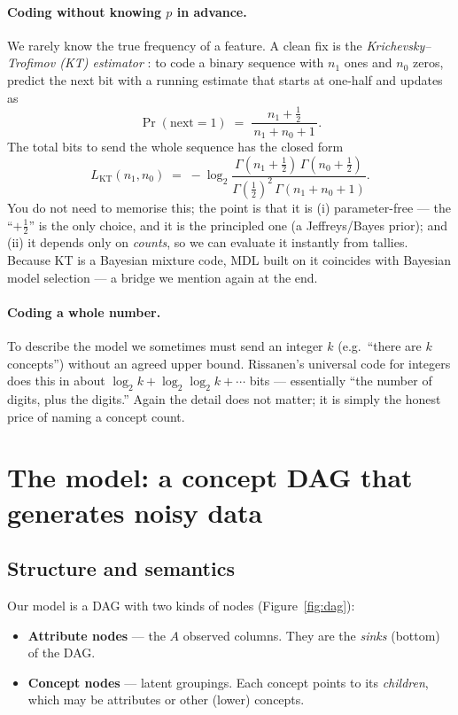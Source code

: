 \documentclass[11pt]{article}
\newcommand{\CL}{L}                       %
\begin{document}
\paragraph{Coding without knowing $p$ in advance.} We rarely know the true
frequency of a feature. A clean fix is the \emph{Krichevsky--Trofimov (KT)
estimator} \cite{krichevsky1981}: to code a binary sequence with $n_1$ ones and
$n_0$ zeros, predict the next bit with a running estimate that starts at
one-half and updates as
\[
  \Pr(\text{next}=1) \;=\; \frac{n_1 + \tfrac12}{\,n_1 + n_0 + 1\,}.
\]
The total bits to send the whole sequence has the closed form
\[
  \CL_{\mathrm{KT}}(n_1,n_0)
  \;=\; -\log_2 \frac{\Gamma(n_1+\tfrac12)\,\Gamma(n_0+\tfrac12)}
                     {\Gamma(\tfrac12)^2\,\Gamma(n_1+n_0+1)} .
\]
You do not need to memorise this; the point is that it is (i) parameter-free ---
the ``$+\tfrac12$'' is the only choice, and it is the principled one (a
Jeffreys/Bayes prior); and (ii) it depends only on \emph{counts}, so we can
evaluate it instantly from tallies. Because KT is a Bayesian mixture code, MDL
built on it coincides with Bayesian model selection --- a bridge we mention again
at the end.

\paragraph{Coding a whole number.} To describe the model we sometimes must send
an integer $k$ (e.g.\ ``there are $k$ concepts'') without an agreed upper bound.
Rissanen's universal code for integers \cite{rissanen1983} does this in about
$\log_2 k + \log_2\log_2 k + \cdots$ bits --- essentially ``the number of digits,
plus the digits.'' Again the detail does not matter; it is simply the honest
price of naming a concept count.

\section{The model: a concept DAG that generates noisy data}

\subsection{Structure and semantics}

Our model is a DAG with two kinds of nodes (Figure~\ref{fig:dag}):
\begin{itemize}
  \item \textbf{Attribute nodes} --- the $A$ observed columns. They are the
        \emph{sinks} (bottom) of the DAG.
  \item \textbf{Concept nodes} --- latent groupings. Each concept points to its
        \emph{children}, which may be attributes or other (lower) concepts.
\end{itemize}
\end{document}
